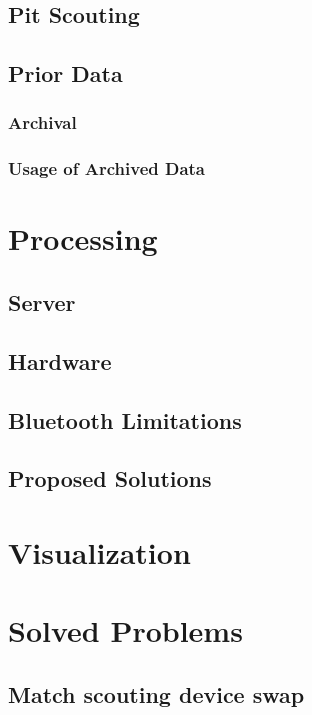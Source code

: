 \documentclass[11pt]{report}
\begin{document}
\subsection{Pit Scouting}
\subsection{Prior Data}
\subsubsection{Archival}
\subsubsection{Usage of Archived Data}


\section{Processing}
\subsection {Server}
\subsection{Hardware}
\subsection{Bluetooth Limitations}
\subsection{Proposed Solutions}


\section{Visualization}
\label{sec:visualization}


\section{Solved Problems}
\subsection{Match scouting device swap}
\label{sec:msdeviceswap}
\end{document}
